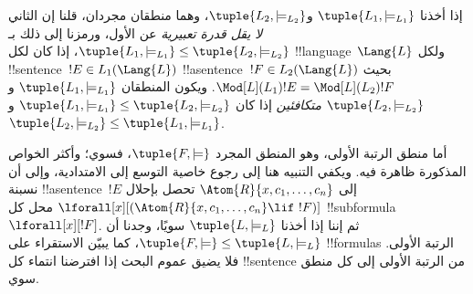 \documentclass[../../../include/open-logic-section]{subfiles}
\begin{document}
\begin{defn}
إذا أخذنا $\tuple{L_1,\models_{L_1}}$ و$\tuple{L_2,\models_{L_2}}$، وهما منطقان
مجردان، قلنا إن الثاني \emph{لا يقل قدرة تعبيرية} عن الأول، ورمزنا إلى ذلك بـ
$\tuple{L_1,\models_{L_1}} \leq \tuple{L_2,\models_{L_2}}$، إذا كان
لكل !!{language}~$\Lang{L}$ ولكل !!{sentence}~$!E \in L_1(\Lang{L})$
!!a{sentence}~$!F \in L_2(\Lang{L})$ بحيث
$\Mod[L](L_1){!E}=\Mod[L](L_2){!F}$. ويكون المنطقان
$\tuple{L_1,\models_{L_1}}$ و$\tuple{L_2,\models_{L_2}}$
\emph{متكافئين} إذا كان
$\tuple{L_1,\models_{L_1}} \leq \tuple{L_2,\models_{L_2}}$ و
$\tuple{L_2,\models_{L_2}} \leq \tuple{L_1,\models_{L_1}}$.
\end{defn}

\begin{rem}
  أما منطق الرتبة الأولى، وهو المنطق المجرد $\tuple{F,\models}$، فسوي؛
  وأكثر الخواص المذكورة ظاهرة فيه. ويكفي التنبيه هنا إلى
  رجوع خاصية التوسع إلى الامتدادية، وإلى أن نسبنة !!a{sentence}~$!E$ إلى
  $\Atom{R}{x,c_1,\dots,c_n}$ تحصل بإحلال
  $\lforall[x][(\Atom{R}{x,c_1,\dots,c_n} \lif \ !F)]$ محل كل
  !!{subformula}~$\lforall[x][!F]$. ثم إننا إذا أخذنا
  $\tuple{L,\models_L}$ سويًا، وجدنا أن
  $\tuple{F,\models} \leq \tuple{L,\models_L}$، كما يبيّن الاستقراء على
  !!{formula}s الرتبة الأولى. فلا يضيق عموم البحث إذا افترضنا
  انتماء كل !!{sentence} من الرتبة الأولى إلى كل منطق سوي.
\end{rem}
\end{document}
